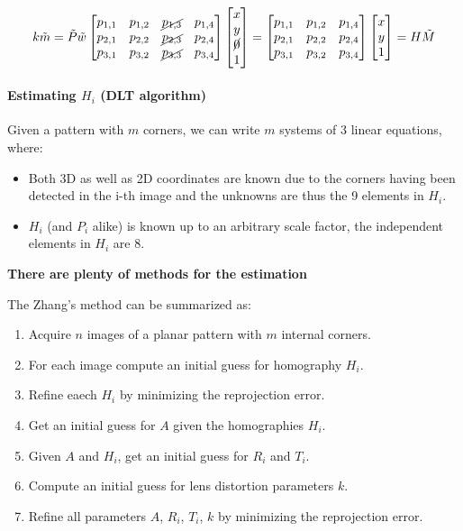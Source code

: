 \documentclass{article}
\begin{document}
$$k\tilde{m} = \tilde{P}\tilde{w}
\begin{bmatrix}
  p_{1,1} & p_{1,2} & \cancel{p_{1,3}} & p_{1,4} \\
  p_{2,1} & p_{2,2} & \cancel{p_{2,3}} & p_{2,4} \\
  p_{3,1} & p_{3,2} & \cancel{p_{3,3}} & p_{3,4} 
\end{bmatrix}
\begin{bmatrix}
x \\ y \\ \cancel{0} \\ 1
\end{bmatrix}
=
\begin{bmatrix}
  p_{1,1} & p_{1,2} & p_{1,4} \\
  p_{2,1} & p_{2,2} & p_{2,4} \\
  p_{3,1} & p_{3,2} & p_{3,4} 
\end{bmatrix}
\begin{bmatrix}
x \\ y \\ 1
\end{bmatrix}
= H\tilde{M}
$$

\paragraph{Estimating $H_i$ (DLT algorithm)}
Given a pattern with $m$ corners, we can write $m$ systems of 3 linear equations, where:
\begin{itemize}
  \item Both 3D as well as 2D coordinates are known due to the corners having been detected in the i-th image and the unknowns are thus the 9 elements in $H_i$.
  \item $H_i$ (and $P_i$ alike) is known up to an arbitrary scale factor, the independent elements in $H_i$ are 8.
\end{itemize}

\textbf{There are plenty of methods for the estimation}

The Zhang's method can be summarized as:
\begin{enumerate}
  \item Acquire $n$ images of a planar pattern with $m$ internal corners.
  \item For each image compute an initial guess for homography $H_i$.
  \item Refine eaech $H_i$ by minimizing the reprojection error.
  \item Get an initial guess for $A$ given the homographies $H_i$.
  \item Given $A$ and $H_i$, get an initial guess for $R_i$ and $T_i$.
  \item Compute an initial guess for lens distortion parameters $k$.
  \item Refine all parameters $A$, $R_i$, $T_i$, $k$ by minimizing the reprojection error.
\end{enumerate}
\end{document}
